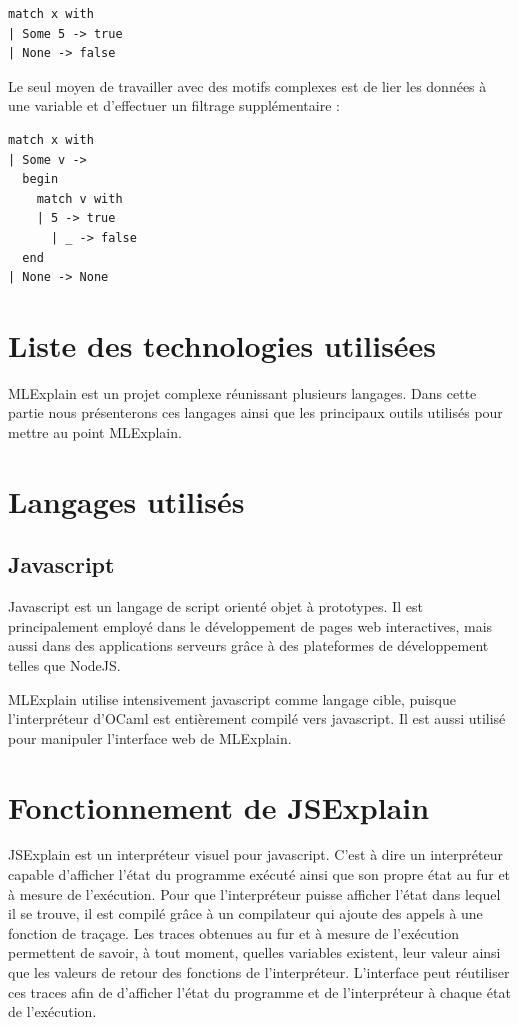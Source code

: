 \documentclass{easychair}
\begin{document}
\begin{verbatim}
match x with
| Some 5 -> true
| None -> false
\end{verbatim}

Le seul moyen de travailler avec des motifs complexes est de lier les données à 
une variable et d'effectuer un filtrage supplémentaire :

\begin{verbatim}
match x with
| Some v ->
  begin
    match v with
    | 5 -> true
      | _ -> false
  end
| None -> None
\end{verbatim}

\section{Liste des technologies utilisées}
MLExplain est un projet complexe réunissant plusieurs langages. Dans cette 
partie nous présenterons ces langages ainsi que les principaux outils utilisés 
pour mettre au point MLExplain.

\section{Langages utilisés}
\subsection{Javascript}
Javascript est un langage de script orienté objet à prototypes. Il est 
principalement employé dans le développement de pages web interactives, mais 
aussi dans des applications serveurs grâce à des plateformes de développement 
telles que NodeJS.

MLExplain utilise intensivement javascript comme langage cible, puisque 
l'interpréteur d'OCaml est entièrement compilé vers javascript. Il est aussi 
utilisé pour manipuler l'interface web de MLExplain.



\section{Fonctionnement de JSExplain}
JSExplain est un interpréteur visuel pour javascript. C'est à dire un 
interpréteur capable d'afficher l'état du programme exécuté ainsi que son 
propre état au fur et à mesure de l'exécution. Pour que l'interpréteur puisse 
afficher l'état dans lequel il se trouve, il est compilé grâce à un compilateur 
qui ajoute des appels à une fonction de traçage. Les traces obtenues au fur et 
à mesure de l'exécution permettent de savoir, à tout moment, quelles variables 
existent, leur valeur ainsi que les valeurs de retour des fonctions de 
l'interpréteur. L'interface peut réutiliser ces traces afin de d'afficher 
l'état du programme et de l'interpréteur à chaque état de l'exécution.
\end{document}
